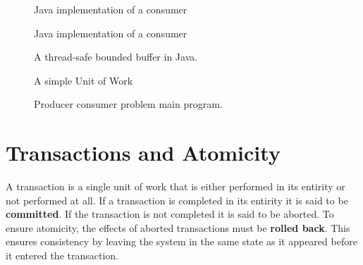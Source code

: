 \documentclass[10pt,a4paper]{article}
\begin{document}
\begin{figure}
\caption{Java implementation of a consumer}
\begin{center}

\label{jconsumer}
\end{center}
\end{figure}

\begin{figure}
\caption{Java implementation of a consumer}
\begin{center}

\label{jproducer}
\end{center}
\end{figure}

\begin{figure}
\caption{A thread-safe bounded buffer in Java.}
\begin{center}

\label{jqueue}
\end{center}
\end{figure}

\begin{figure}
\caption{A simple Unit of Work}
\begin{center}

\label{junit}
\end{center}
\end{figure}

\begin{figure}
\caption{Producer consumer problem main program.}
\begin{center}

\label{jprodconsumer}
\end{center}
\end{figure}

\section{Transactions and Atomicity}
A transaction is a single unit of work that is either performed in its entirity or not performed at all. If a transaction is completed in its entirity it is said to be {\bf committed}. If the transaction is not completed it is said to be aborted. To ensure atomicity, the effects of aborted transactions must be {\bf rolled back}. This ensures consistency by leaving the system in the same state as it appeared before it entered the transaction.  
\end{document}
